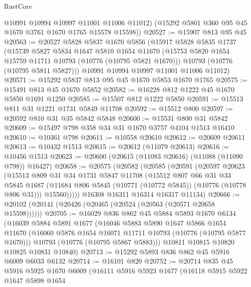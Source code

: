\begin{lexlean}{RustCore}
\begin{coremodule}
        @10991
        @10994
        @10997
        @11001
        @11006
        @11012)
      (@15292 @5801 @360 @95 @45 @1670 @3761 @1670 @1765 @15578 @15598))
@20527 := @15907 @813 @95 @45
@20563 := @20527
    @5828
    @5837
    @1670
    @5856
    (@15917
      @5828
      @5835
      @1737
      (@15739
        @5827
        @5834
        @1647
        @5810
        @1654
        @11670
        (@15753 @5820 @1654 @15759 @11711 @10793 (@10776 (@10795 @5821 @1670)))
        @10793
        (@10776 (@10795 @5811 @5827)))
      @10991
      @10994
      @10997
      @11001
      @11006
      @11012)
@20571 := @15292 @5837 @813 @95 @45 @1670 @5853 @1670 @1765
@20575 := @15491 @813 @45 @1670 @5852
@20582 := @16228 @812 @1222 @45 @1670 @5850 @1691 @1250
@20585 := @15507 @812 @1222 @5850
@20591 := @15513 @811 @31 @1221 @1731 @5849 @11708
@20592 := @15512 @800
@20597 := @20592 @810 @31 @35 @5842 @5848
@20600 := @15531 @800 @31 @5842
@20609 := @15497 @798 @358 @34 @31 @1670 @3757 @4104 @1513 @16410
@20610 := @10361 @798
@20611 := @10558 @20610
@20612 := @20609 @20611
@20613 := @10432 @1513
@20615 := @20612 (@11079 @20613)
@20616 := @10456 @1513
@20623 := @20600 (@20615 (@11083 @20616) (@11088 (@11090 @798)) @16427)
@20658 := @20575
    (@20582
      (@20585
        (@20591
          (@20597
            @20623
            (@15513
              @809
              @31
              @34
              @1731
              @5847
              @11708
              (@15512
                @807
                @66
                @31
                @33
                @5845
                @1687
                (@11684 @806 @5845 (@10771 (@10772 @5845)) (@10776 (@10778 @806 @31)))
                @15560)))))
      @16308
      @16311
      @16314
      @16317
      @11134)
@20666 := @20102 (@20141 (@20426 (@20465 (@20524 (@20563 (@20571 @20658 @15598))))))
@20705 := @16029
    @836
    @862
    @45
    @5884
    @5893
    @1670
    @6134
    (@16039
      @5884
      @5891
      @1677
      (@16046
        @5883
        @5890
        @1647
        @5866
        @1654
        @11670
        (@16060 @5876 @1654 @16071 @11711 @10793 (@10776 (@10795 @5877 @1670)))
        @10793
        (@10776 (@10795 @5867 @5883)))
      @10811
      @10815
      @10820
      @10825
      @10831
      @10840)
@20713 := @15292 @5893 @836 @862 @45 @5916 @6009 @6033 @6132
@20714 := @16101 @820
@20752 := @20714
    @835
    @45
    @5916
    @5925
    @1670
    @6009
    (@16111
      @5916
      @5923
      @1677
      (@16118
        @5915
        @5922
        @1647
        @5898
        @1654

\end{coremodule}
\end{lexlean}
